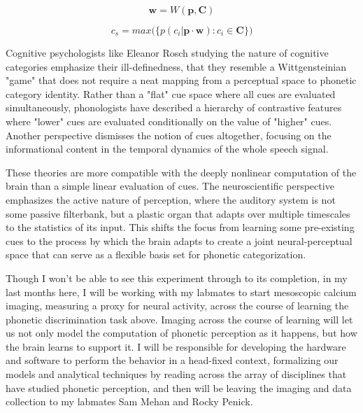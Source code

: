 \begin{equation}
\label{eqn:w}
\mathbf{w} = W(\mathbf{p}, \mathbf{C})
\end{equation}

\begin{equation}
\label{eqn:infer_2}
c_s = max\big( \big\{ p(c_i | \mathbf{p} \cdot \mathbf{w}) : c_i \in \mathbf{C} \big\}\big)
\end{equation}

Cognitive psychologists like Eleanor Rosch studying the nature of cognitive categories emphasize their ill-definedness, that they resemble a Wittgensteinian "game" that does not require a neat mapping from a perceptual space to phonetic category identity\cite{roschWittgensteinCategorizationResearch1987, roschFamilyResemblancesStudies1975}. Rather than a "flat" cue space where all cues are evaluated simultaneously, phonologists have described a hierarchy of contrastive features where "lower" cues are evaluated conditionally on the value of "higher" cues\cite{Dresher2008}. Another perspective dismisses the notion of cues altogether, focusing on the informational content in the temporal dynamics of the whole speech signal\cite{kluenderLongstandingProblemsSpeech2019}.

These theories are more compatible with the deeply nonlinear computation of the brain than a simple linear evaluation of cues. The neuroscientific perspective emphasizes the active nature of perception, where the auditory system is not some passive filterbank, but a plastic organ that adapts over multiple timescales to the statistics of its input\cite{angeloniContextualModulationSound2018, holtTemporallyNonadjacentNonlinguistic2005}. This shifts the focus from learning some pre-existing cues to the process by which the brain adapts to create a joint neural-perceptual space that can serve as a flexible basis set for phonetic categorization. 

\begin{todo}
\label{todo:speech}
Though I won't be able to see this experiment through to its completion, in my last months here, I will be working with my labmates to start mesoscopic calcium imaging, measuring a proxy for neural activity, across the course of learning the phonetic discrimination task above. Imaging across the course of learning will let us not only model the computation of phonetic perception as it happens, but how the brain learns to support it. I will be responsible for developing the hardware and software to perform the behavior in a head-fixed context, formalizing our models and analytical techniques by reading across the array of disciplines that have studied phonetic perception, and then will be leaving the imaging and data collection to my labmates Sam Mehan and Rocky Penick.
\end{todo}
